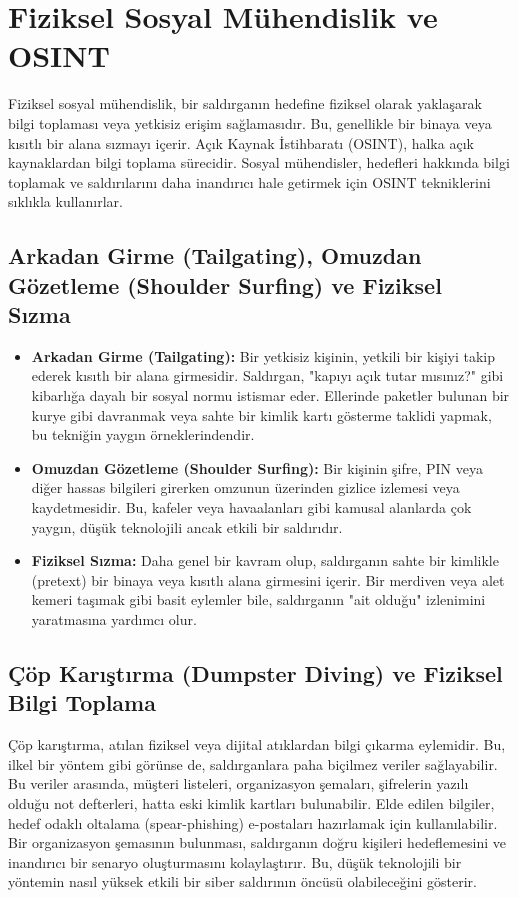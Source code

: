 \section{Fiziksel Sosyal Mühendislik ve OSINT}

Fiziksel sosyal mühendislik, bir saldırganın hedefine fiziksel olarak yaklaşarak bilgi toplaması veya yetkisiz erişim sağlamasıdır. Bu, genellikle bir binaya veya kısıtlı bir alana sızmayı içerir. Açık Kaynak İstihbaratı (OSINT), halka açık kaynaklardan bilgi toplama sürecidir. Sosyal mühendisler, hedefleri hakkında bilgi toplamak ve saldırılarını daha inandırıcı hale getirmek için OSINT tekniklerini sıklıkla kullanırlar.

\subsection{Arkadan Girme (Tailgating), Omuzdan Gözetleme (Shoulder Surfing) ve Fiziksel Sızma}

\begin{itemize}
    \item \textbf{Arkadan Girme (Tailgating):} Bir yetkisiz kişinin, yetkili bir kişiyi takip ederek kısıtlı bir alana girmesidir. Saldırgan, "kapıyı açık tutar mısınız?" gibi kibarlığa dayalı bir sosyal normu istismar eder. Ellerinde paketler bulunan bir kurye gibi davranmak veya sahte bir kimlik kartı gösterme taklidi yapmak, bu tekniğin yaygın örneklerindendir.
    \item \textbf{Omuzdan Gözetleme (Shoulder Surfing):} Bir kişinin şifre, PIN veya diğer hassas bilgileri girerken omzunun üzerinden gizlice izlemesi veya kaydetmesidir. Bu, kafeler veya havaalanları gibi kamusal alanlarda çok yaygın, düşük teknolojili ancak etkili bir saldırıdır.
    \item \textbf{Fiziksel Sızma:} Daha genel bir kavram olup, saldırganın sahte bir kimlikle (pretext) bir binaya veya kısıtlı alana girmesini içerir. Bir merdiven veya alet kemeri taşımak gibi basit eylemler bile, saldırganın "ait olduğu" izlenimini yaratmasına yardımcı olur.
\end{itemize}

\subsection{Çöp Karıştırma (Dumpster Diving) ve Fiziksel Bilgi Toplama}

Çöp karıştırma, atılan fiziksel veya dijital atıklardan bilgi çıkarma eylemidir. Bu, ilkel bir yöntem gibi görünse de, saldırganlara paha biçilmez veriler sağlayabilir. Bu veriler arasında, müşteri listeleri, organizasyon şemaları, şifrelerin yazılı olduğu not defterleri, hatta eski kimlik kartları bulunabilir. Elde edilen bilgiler, hedef odaklı oltalama (spear-phishing) e-postaları hazırlamak için kullanılabilir. Bir organizasyon şemasının bulunması, saldırganın doğru kişileri hedeflemesini ve inandırıcı bir senaryo oluşturmasını kolaylaştırır. Bu, düşük teknolojili bir yöntemin nasıl yüksek etkili bir siber saldırının öncüsü olabileceğini gösterir.

